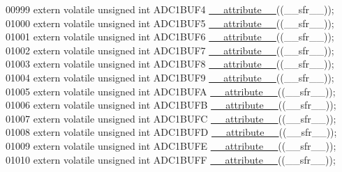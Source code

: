 \begin{DoxyCode}
00999 \textcolor{keyword}{extern} \textcolor{keyword}{volatile} \textcolor{keywordtype}{unsigned} \textcolor{keywordtype}{int}  ADC1BUF4 \hyperlink{a00015_a493c46f03454991ccc5aa7a6e1dfb2a7}{\_\_attribute\_\_}((\_\_sfr\_\_));
01000 \textcolor{keyword}{extern} \textcolor{keyword}{volatile} \textcolor{keywordtype}{unsigned} \textcolor{keywordtype}{int}  ADC1BUF5 \hyperlink{a00015_a493c46f03454991ccc5aa7a6e1dfb2a7}{\_\_attribute\_\_}((\_\_sfr\_\_));
01001 \textcolor{keyword}{extern} \textcolor{keyword}{volatile} \textcolor{keywordtype}{unsigned} \textcolor{keywordtype}{int}  ADC1BUF6 \hyperlink{a00015_a493c46f03454991ccc5aa7a6e1dfb2a7}{\_\_attribute\_\_}((\_\_sfr\_\_));
01002 \textcolor{keyword}{extern} \textcolor{keyword}{volatile} \textcolor{keywordtype}{unsigned} \textcolor{keywordtype}{int}  ADC1BUF7 \hyperlink{a00015_a493c46f03454991ccc5aa7a6e1dfb2a7}{\_\_attribute\_\_}((\_\_sfr\_\_));
01003 \textcolor{keyword}{extern} \textcolor{keyword}{volatile} \textcolor{keywordtype}{unsigned} \textcolor{keywordtype}{int}  ADC1BUF8 \hyperlink{a00015_a493c46f03454991ccc5aa7a6e1dfb2a7}{\_\_attribute\_\_}((\_\_sfr\_\_));
01004 \textcolor{keyword}{extern} \textcolor{keyword}{volatile} \textcolor{keywordtype}{unsigned} \textcolor{keywordtype}{int}  ADC1BUF9 \hyperlink{a00015_a493c46f03454991ccc5aa7a6e1dfb2a7}{\_\_attribute\_\_}((\_\_sfr\_\_));
01005 \textcolor{keyword}{extern} \textcolor{keyword}{volatile} \textcolor{keywordtype}{unsigned} \textcolor{keywordtype}{int}  ADC1BUFA \hyperlink{a00015_a493c46f03454991ccc5aa7a6e1dfb2a7}{\_\_attribute\_\_}((\_\_sfr\_\_));
01006 \textcolor{keyword}{extern} \textcolor{keyword}{volatile} \textcolor{keywordtype}{unsigned} \textcolor{keywordtype}{int}  ADC1BUFB \hyperlink{a00015_a493c46f03454991ccc5aa7a6e1dfb2a7}{\_\_attribute\_\_}((\_\_sfr\_\_));
01007 \textcolor{keyword}{extern} \textcolor{keyword}{volatile} \textcolor{keywordtype}{unsigned} \textcolor{keywordtype}{int}  ADC1BUFC \hyperlink{a00015_a493c46f03454991ccc5aa7a6e1dfb2a7}{\_\_attribute\_\_}((\_\_sfr\_\_));
01008 \textcolor{keyword}{extern} \textcolor{keyword}{volatile} \textcolor{keywordtype}{unsigned} \textcolor{keywordtype}{int}  ADC1BUFD \hyperlink{a00015_a493c46f03454991ccc5aa7a6e1dfb2a7}{\_\_attribute\_\_}((\_\_sfr\_\_));
01009 \textcolor{keyword}{extern} \textcolor{keyword}{volatile} \textcolor{keywordtype}{unsigned} \textcolor{keywordtype}{int}  ADC1BUFE \hyperlink{a00015_a493c46f03454991ccc5aa7a6e1dfb2a7}{\_\_attribute\_\_}((\_\_sfr\_\_));
01010 \textcolor{keyword}{extern} \textcolor{keyword}{volatile} \textcolor{keywordtype}{unsigned} \textcolor{keywordtype}{int}  ADC1BUFF \hyperlink{a00015_a493c46f03454991ccc5aa7a6e1dfb2a7}{\_\_attribute\_\_}((\_\_sfr\_\_));

\end{DoxyCode}
